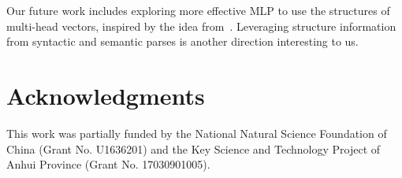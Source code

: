 \documentclass[11pt]{article}
\begin{document}
Our future work includes exploring more effective MLP to use the structures of multi-head vectors, inspired by the idea from~. Leveraging structure information from syntactic and semantic parses
is another direction interesting to us.

\section*{Acknowledgments}
This work was partially funded by the National Natural Science Foundation of China (Grant No. U1636201) and the Key Science and Technology Project of Anhui Province (Grant No. 17030901005).


\clearpage


\end{document}
